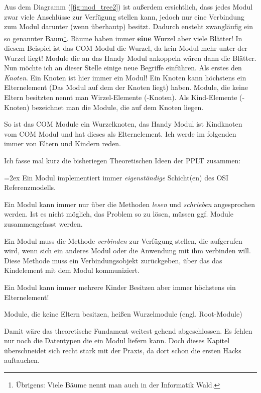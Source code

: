 \documentclass[a4paper,10pt]{book}
\newenvironment{merke}%
    {\begin{center}\bfseries\begin{Sbox}\begin{minipage}{10cm}\parskip=2ex}%
    {\end{minipage}\end{Sbox}\fbox{\TheSbox}\end{center}}
\begin{document}
    Aus dem Diagramm (\ref{fig:mod_tree2}) ist außerdem ersichtlich, dass 
    jedes Modul zwar viele Anschlüsse zur Verfügung stellen kann, jedoch nur
    eine Verbindung zum Modul darunter (wenn überhautp) besitzt. Dadurch 
    ensteht zwangläufig ein so genannter Baum\footnote{Übrigens: Viele Bäume 
    nennt man auch in der Informatik Wald.}. Bäume haben immer \textbf{eine}
    Wurzel aber viele Blätter! In diesem Beispiel ist das COM-Modul die 
    Wurzel, da kein Modul mehr unter der Wurzel liegt! Module  die an das Handy
    Modul ankoppeln wären dann die Blätter. 
    Nun möchte ich an dieser Stelle einige neue Begriffe einführen.
    Als erstes den \emph{Knoten}. Ein Knoten ist hier immer ein Modul!
    Ein Knoten kann höchstens ein Elternelement (Das Modul auf dem der 
    Knoten liegt) haben. Module, die keine Eltern besitzten nennt man
    Wirzel-Elemente (-Knoten). Als Kind-Elemente (-Knoten) bezeichnet
    man die Module, die auf dem Knoten liegen. 
    
    So ist das COM Module ein Wurzelknoten, das Handy Modul ist 
    Kindknoten vom COM Modul und hat dieses als Elternelement.
    Ich werde im folgenden immer von Eltern und Kindern reden.
    
    Ich fasse mal kurz die bisheriegen Theoretischen Ideen der PPLT zusammen:
    \begin{merke}
        Ein Modul implementiert immer \emph{eigenständige} Schicht(en) des OSI
        Referenzmodells.
        
        Ein Modul kann immer nur über die Methoden \emph{lesen} und 
        \emph{schrieben} angesprochen werden. Ist es nicht möglich, das 
        Problem so zu lösen, müssen ggf. Module zusammengefasst werden.
        
        Ein Modul muss die Methode \emph{verbinden} zur Verfügung stellen,
        die aufgerufen wird, wenn sich ein anderes Modul oder die Anwendung
        mit ihm verbinden will. Diese Methode muss ein Verbindungsobjekt 
        zurückgeben, über das das Kindelement mit dem Modul kommuniziert.
        
        Ein Modul kann immer mehrere Kinder Besitzen aber immer höchstens ein
        Elternelement!
        
        Module, die keine Eltern besitzen, heißen Wurzelmodule (engl. 
        Root-Module)
    \end{merke}
    
    Damit wäre das theoretische Fundament weitest gehend abgeschlossen. Es 
    fehlen nur noch die Datentypen die ein Modul liefern kann. Doch dieses
    Kapitel überschneidet sich recht stark mit der Praxis, da dort schon die
    ersten Hacks auftauchen.
    
\end{document}
